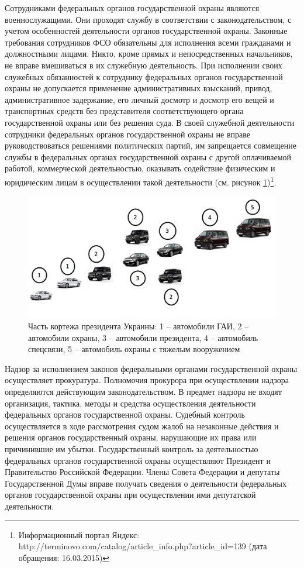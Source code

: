 \documentclass[a4paper,12pt,fleqn]{article} %
\begin{document}
Сотрудниками федеральных органов государственной охраны являются военнослужащими. Они проходят службу в соответствии с законодательством, с учетом особенностей деятельности органов государственной охраны. Законные требования сотрудников ФСО обязательны для исполнения всеми гражданами и должностными лицами. Никто, кроме прямых и непосредственных начальников, не вправе вмешиваться в их служебную деятельность. При исполнении своих служебных обязанностей к сотруднику федеральных органов государственной охраны не допускается применение административных взысканий, привод, административное задержание, его личный досмотр и досмотр его вещей и транспортных средств без представителя соответствующего органа государственной охраны или без решения суда. В своей служебной деятельности сотрудники федеральных органов государственной охраны не вправе руководствоваться решениями политических партий, им запрещается совмещение службы в федеральных органах государственной охраны с другой оплачиваемой работой, коммерческой деятельностью, оказывать содействие физическим и юридическим лицам в осуществлении такой деятельности (см. рисунок \ref{image8})\footnote{Информационный портал Яндекс: http://terminovo.com/catalog/article\_info.php?article\_id=139 (дата обращения: 16.03.2015)}.

\begin{figure}[h]
	\centering
	\includegraphics[scale=0.6]{img8}
	\caption{Часть кортежа президента Украины: 1 – автомобили ГАИ, 2 – автомобили охраны, 3 – автомобили президента, 4 – автомобиль спецсвязи, 5 – автомобиль охраны с тяжелым вооружением}
	\label{image8}
\end{figure}

Надзор за исполнением законов федеральными органами государственной охраны осуществляет прокуратура. Полномочия прокурора при осуществлении надзора определяются действующим законодательством. В предмет надзора не входят организация, тактика, методы и средства осуществления деятельности федеральных органов государственной охраны. 	Судебный контроль осуществляется в ходе рассмотрения судом жалоб на незаконные действия и решения органов государственный охраны, нарушающие их права или причинившие им убытки. 	Государственный контроль за деятельностью федеральных органов государственной охраны осуществляют Президент и Правительство Российской Федерации. Члены Совета Федерации и депутаты Государственной Думы вправе получать сведения о деятельности федеральных органов государственной охраны при осуществлении ими депутатской деятельности.
\end{document}
